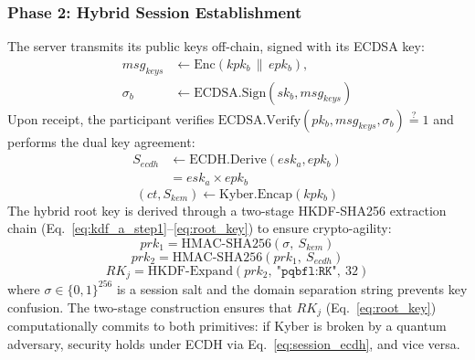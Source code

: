 \documentclass[journal, 10pt, twocolumn]{IEEEtran}
\begin{document}
\subsubsection{Phase 2: Hybrid Session Establishment}


The server transmits its public keys off-chain, signed with its ECDSA key:
\begin{equation}
\begin{split}
msg_{keys} &\leftarrow \text{Enc}(kpk_b \,\|\, epk_b), \\
\sigma_b &\leftarrow \text{ECDSA.Sign}(sk_b, msg_{keys})
\end{split}
\label{eq:session_send}
\end{equation}
Upon receipt, the participant verifies $\text{ECDSA.Verify}(pk_b, msg_{keys}, \sigma_b) \stackrel{?}{=} 1$ and performs the dual key agreement:
\begin{equation}
\begin{split}
S_{ecdh} &\leftarrow \text{ECDH.Derive}(esk_a, epk_b) \\
         &= esk_a \times epk_b
\end{split}
\label{eq:session_ecdh}
\end{equation}
\begin{equation}
(ct, S_{kem}) \leftarrow \text{Kyber.Encap}(kpk_b)
\label{eq:session_kem}
\end{equation}
The hybrid root key is derived through a two-stage HKDF-SHA256 extraction chain (Eq.~\eqref{eq:kdf_a_step1}--\eqref{eq:root_key}) to ensure crypto-agility:
\begin{equation}
prk_1 = \text{HMAC-SHA256}(\sigma,\ S_{kem})
\label{eq:kdf_a_step1}
\end{equation}
\begin{equation}
prk_2 = \text{HMAC-SHA256}(prk_1,\ S_{ecdh})
\label{eq:kdf_a_step2}
\end{equation}
\begin{equation}
RK_j = \text{HKDF-Expand}(prk_2,\ \texttt{"pqbfl:RK"},\ 32)
\label{eq:root_key}
\end{equation}
where $\sigma \in \{0,1\}^{256}$ is a session salt and the domain separation string prevents key confusion. The two-stage construction ensures that $RK_j$ (Eq.~\eqref{eq:root_key}) computationally commits to both primitives: if Kyber is broken by a quantum adversary, security holds under ECDH via Eq.~\eqref{eq:session_ecdh}, and vice versa.
\end{document}

